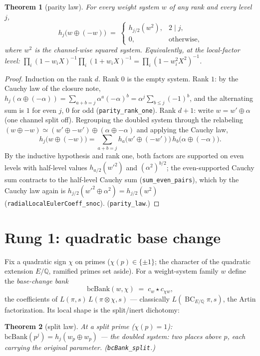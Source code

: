 \documentclass[11pt]{article}
\newtheorem{theorem}{Theorem}
\newcommand{\BC}{\operatorname{BC}}
\begin{document}
\begin{theorem}[parity law]\label{thm:parity}
For every weight system $w$ of any rank and every level $j$,
\[
  h_j\bigl(w\oplus(-w)\bigr)\;=\;
  \begin{cases} h_{j/2}(w^2), & 2\mid j,\\ 0, & \text{otherwise,}\end{cases}
\]
where $w^2$ is the channel-wise squared system.  Equivalently, at the local-factor level:
$\prod_i(1-w_iX)^{-1}\prod_i(1+w_iX)^{-1}=\prod_i(1-w_i^2X^2)^{-1}$.
\end{theorem}
\begin{proof}
Induction on the rank $d$.  Rank $0$ is the empty system.  Rank $1$: by the Cauchy law of
the closure note, $h_j(\alpha\oplus(-\alpha))=\sum_{a+b=j}\alpha^a(-\alpha)^b
=\alpha^j\sum_{b\le j}(-1)^b$, and the alternating sum is $1$ for even $j$, $0$ for odd
(\texttt{parity\_rank\_one}).  Rank $d+1$: write $w=w'\oplus\alpha$ (one channel split
off).  Regrouping the doubled system through the relabeling
$(w\oplus -w)\simeq(w'\oplus -w')\oplus(\alpha\oplus-\alpha)$ and applying the Cauchy law,
\[
  h_j\bigl(w\oplus(-w)\bigr)=\sum_{a+b=j}h_a\bigl(w'\oplus(-w')\bigr)\,
    h_b\bigl(\alpha\oplus(-\alpha)\bigr).
\]
By the inductive hypothesis and rank one, both factors are supported on even levels with
half-level values $h_{a/2}(w'^2)$ and $(\alpha^2)^{b/2}$; the even-supported Cauchy sum
contracts to the half-level Cauchy sum (\texttt{sum\_even\_pairs}), which by the Cauchy law
again is $h_{j/2}(w'^2\oplus\alpha^2)=h_{j/2}(w^2)$ (\texttt{radialLocalEulerCoeff\_snoc}).
(\texttt{parity\_law}.)
\end{proof}

\section{Rung 1: quadratic base change}

Fix a quadratic sign $\chi$ on primes ($\chi(p)\in\{\pm1\}$; the character of the quadratic
extension $E/\mathbb Q$, ramified primes set aside).  For a weight-system family $w$ define
the \emph{base-change bank}
\[
  \mathrm{bcBank}(w,\chi)\;=\;c_w\star c_{\chi w},
\]
the coefficients of $L(\pi,s)\,L(\pi\otimes\chi,s)$ — classically $L(\BC_{E/\mathbb Q}\pi,s)$,
the Artin factorization.  Its local shape is the split/inert dichotomy:

\begin{theorem}[split law]\label{thm:split}
At a split prime ($\chi(p)=1$): $\mathrm{bcBank}(p^j)=h_j(w_p\oplus w_p)$ — the doubled
system: two places above $p$, each carrying the original parameter.
(\texttt{bcBank\_split}.)
\end{theorem}
\end{document}
